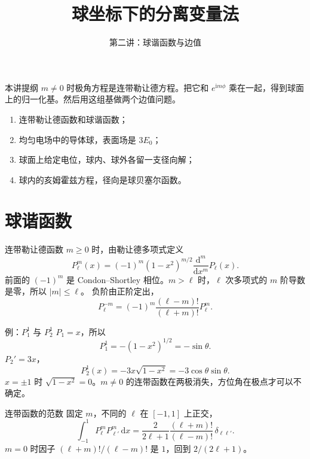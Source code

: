 \documentclass[fontset=windows, chinese, 10pt, xcolor=dvipsnames]{beamer}
\title{球坐标下的分离变量法}
\subtitle{第二讲：球谐函数与边值}
\begin{document}
\begin{frame}
  \titlepage
\end{frame}

\begin{frame}{本讲提纲}
  $m\neq 0$ 时极角方程是连带勒让德方程。把它和 $e^{\mathrm{i}m\phi}$ 乘在一起，得到球面上的归一化基。然后用这组基做两个边值问题。
  \begin{enumerate}
    \item 连带勒让德函数和球谐函数；
    \item 均匀电场中的导体球，表面场是 $3E_0$；
    \item 球面上给定电位，球内、球外各留一支径向解；
    \item 球内的亥姆霍兹方程，径向是球贝塞尔函数。
  \end{enumerate}
\end{frame}

\section{球谐函数}

\begin{frame}{连带勒让德函数}
  $m\geq 0$ 时，由勒让德多项式定义
  \begin{equation*}
    P_{\ell}^{m}(x)
    =(-1)^{m}(1-x^2)^{m/2}
      \frac{\mathrm{d}^{m}}{\mathrm{d}x^{m}}P_{\ell}(x).
  \end{equation*}
  前面的 $(-1)^{m}$ 是 Condon--Shortley 相位。$m>\ell$ 时，$\ell$ 次多项式的 $m$ 阶导数是零，所以 $|m|\leq\ell$。
  \vspace{0.3em}
  负阶由正阶定出，
  \[
    P_{\ell}^{-m}
    =(-1)^{m}\frac{(\ell-m)!}{(\ell+m)!}P_{\ell}^{m}.
  \]
\end{frame}

\begin{frame}{例：$P_1^{1}$ 与 $P_2^{1}$}
  $P_1=x$，所以
  \[
    P_1^{1}=-(1-x^2)^{1/2}=-\sin\theta.
  \]
  $P_2'=3x$，
  \[
    P_2^{1}(x)=-3x\sqrt{1-x^2}=-3\cos\theta\sin\theta.
  \]
  $x=\pm 1$ 时 $\sqrt{1-x^2}=0$。$m\neq 0$ 的连带函数在两极消失，方位角在极点才可以不确定。
\end{frame}

\begin{frame}{连带函数的范数}
  固定 $m$，不同的 $\ell$ 在 $[-1,1]$ 上正交，
  \begin{equation*}
    \int_{-1}^{1}P_{\ell}^{m}P_{\ell'}^{m}\,\mathrm{d}x
    =\frac{2}{2\ell+1}\frac{(\ell+m)!}{(\ell-m)!}\,\delta_{\ell\ell'}.
  \end{equation*}
  $m=0$ 时因子 $(\ell+m)!/(\ell-m)!$ 是 $1$，回到 $2/(2\ell+1)$。
\end{frame}
\end{document}
